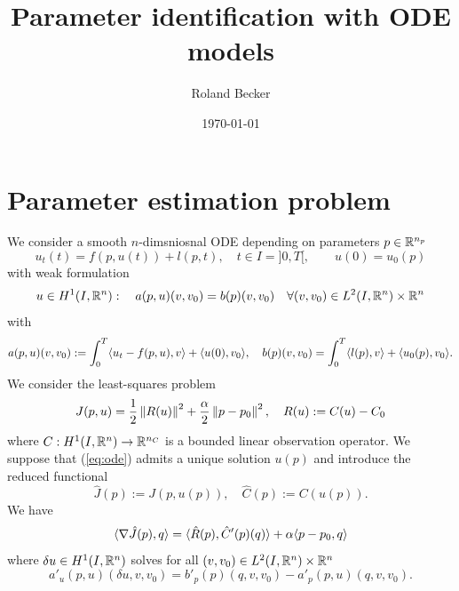 \documentclass[english,12pt,a4paper]{article}
\title{Parameter identification with ODE models}
\author{Roland Becker}
\date{\today}
\begin{document}
\maketitle
\setcounter{tocdepth}{2}
\tableofcontents
%
%
\section{Parameter estimation problem}\label{sec:}
%
We consider a smooth $n$-dimsniosnal ODE depending on parameters $p\in \mathbb R^{n_p}$
%
\begin{equation}\label{eq:ode}
u_t(t) = f(p,u(t)) + l(p,t),\quad t\in I=]0,T[,\qquad u(0) = u_0(p)
\end{equation}
%
with weak formulation
%
\begin{equation}\label{eq:weak_form}
u\in H^1(I,\mathbb R^n):\quad a(p,u)(v,v_0) = b(p)(v,v_0)\quad\forall (v,v_0)\in L^2(I,\mathbb R^n)\times\mathbb R^n
\end{equation}
%
with
%
\begin{equation}\label{eq:forms}
a(p,u)(v,v_0) := \int_0^T \langle u_t - f(p,u),v\rangle + \langle u(0),v_0\rangle,\quad b(p)(v,v_0) = \int_0^T \langle l(p),v\rangle + \langle u_0(p),v_0\rangle.
\end{equation}
%
We consider the least-squares problem
%
\begin{equation}\label{eq:}
J(p,u) = \frac12 \left\|R(u)\right\|^2 + \frac{\alpha}{2}\left\|p-p_0\right\|^2,\quad R(u):= C(u)-C_0
\end{equation}
%
where $C: H^1(I,\mathbb R^n) \to \mathbb R^{n_C}$ is a bounded linear observation operator.
%
We suppose that (\ref{eq:ode}) admits a unique solution $u(p)$ and introduce the reduced functional
%
\begin{equation}\label{eq:}
\hat J (p) := J(p,u(p)),\quad \hat C (p):= C(u(p)).
\end{equation}
%
We have
%
\begin{equation}\label{eq:}
\langle\nabla \hat J(p),q\rangle = \langle\hat R(p),\hat C'(p)(q)\rangle + \alpha\langle p-p_0,q\rangle
\end{equation}
%
where $\delta u\in H^1(I,\mathbb R^n)$ solves for all $(v,v_0)\in L^2(I,\mathbb R^n)\times\mathbb R^n$
%
\begin{equation}\label{eq:weak_form}
a'_u(p,u)(\delta u, v,v_0) = b'_p(p)(q,v,v_0)-a'_p(p,u)(q, v,v_0).
\end{equation}
%

%
\end{document}
